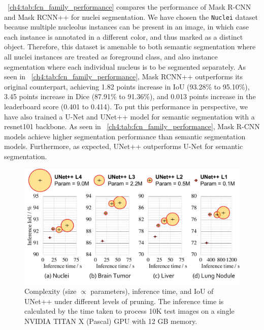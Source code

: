 \tableautorefname~\ref{ch4:tab:fcn_family_performance} compares the performance of Mask R-CNN and Mask RCNN++ for nuclei segmentation.
We have chosen the \texttt{Nuclei} dataset because multiple nucleolus instances can be present in an image, in which case each instance is annotated in a different color, and thus marked as a distinct object. Therefore, this dataset is amenable to both semantic segmentation where all nuclei instances are treated as foreground class, and also instance segmentation where each individual nucleus is to be segmented separately.
As seen in \tableautorefname~\ref{ch4:tab:fcn_family_performance}, Mask RCNN++ outperforms its original counterpart, achieving 1.82 points increase in IoU (93.28\% to 95.10\%), 3.45 points increase in Dice (87.91\% to 91.36\%), and 0.013 points increase in the leaderboard score (0.401 to 0.414). To put this performance in perspective, we have also trained a U-Net and UNet++ model for semantic segmentation with a resnet101 backbone. As seen in \tableautorefname~\ref{ch4:tab:fcn_family_performance}, Mask R-CNN models achieve higher segmentation performance than semantic segmentation models. Furthermore, as expected, UNet++ outperforms U-Net for semantic segmentation.

\begin{figure}[t]
\begin{center}
\includegraphics[width=0.8\linewidth]{Figures/CH4/fig_inference_time.pdf}
\end{center}
\caption[UNet++ Accelerates Inference Speed by Model Pruning]{
Complexity (size $\propto$ parameters), inference time, and IoU of UNet++ under different levels of pruning. The inference time is calculated by the time taken to process 10K test images on a single NVIDIA TITAN X (Pascal) GPU with 12 GB memory.}
\label{ch4:fig:speed_accuracy}
\end{figure}



